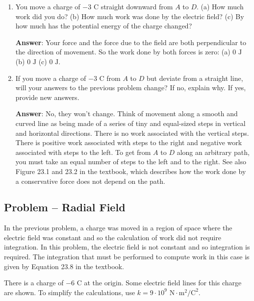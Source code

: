 \documentclass{article}
\begin{document}
\begin{enumerate}
  \item You move a charge of $-3\text{ C}$ straight downward from $A$ to $D$. (a) How much work did you do? (b) How much work was done by the electric field? (c) By how much has the potential energy of the charge changed?

     \ifsolutions
       {\bf Answer}: Your force and the force due to the field are both perpendicular to the direction of movement. So the work done by both forces is zero: (a) $0\text{ J}$ (b) $0\text{ J}$ (c) $0 \text{ J}$.
     \else
       \vskip 48pt
     \fi
     \ifsolutions\else
     \vskip 48pt
     \fi

  \item If you move a charge of $-3\text{ C}$ from $A$ to $D$ but deviate from a straight line, will your answers to the previous problem change? If no, explain why. If yes, provide new answers.

     \ifsolutions
       {\bf Answer}: No, they won't change. Think of movement along a smooth and curved line as being made of a series of tiny and equal-sized steps in vertical and horizontal directions. There is no work associated with the vertical steps. There is positive work associated with steps to the right and negative work associated with steps to the left. To get from $A$ to $D$ along an arbitrary path, you must take an equal number of steps to the left and to the right. See also Figure 23.1 and 23.2 in the textbook, which describes how the work done by a conservative force does not depend on the path.
     \else
       \vskip 36pt
     \fi
     \ifsolutions\else
     \vskip 36pt
     \fi

\end{enumerate}

\newpage

\subsection{Problem -- Radial Field}

In the previous problem, a charge was moved in a region of space where the electric field was constant and so the calculation of work did not require integration. In this problem, the electric field is not constant and so integration is required. The integration that must be performed to compute work in this case is given by Equation 23.8 in the textbook.



There is a charge of $-6\text{ C}$ at the origin. Some electric field lines for this charge are shown. To simplify the calculations, use $k=9\cdot 10^9\text{ N}\cdot \text{m}^2/\text{C}^2$.
\end{document}
